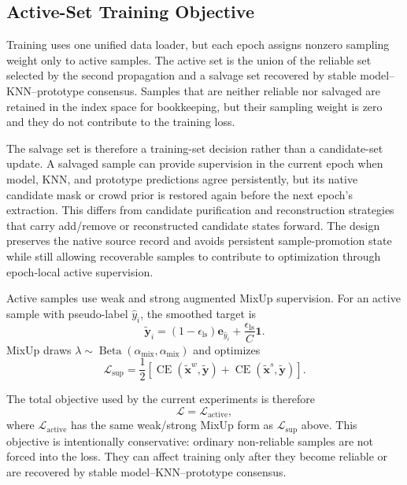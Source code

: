 \subsection{Active-Set Training Objective}
Training uses one unified data loader, but each epoch assigns nonzero sampling
weight only to active samples. The active set is the union of the reliable set
selected by the second propagation and a salvage set recovered by stable
model--KNN--prototype consensus. Samples that are neither reliable nor salvaged
are retained in the index space for bookkeeping, but their sampling weight is
zero and they do not contribute to the training loss.

The salvage set is therefore a training-set decision rather than a
candidate-set update. A salvaged sample can provide supervision in the current
epoch when model, KNN, and prototype predictions agree persistently, but its
native candidate mask or crowd prior is restored again before the next epoch's
extraction. This differs from candidate purification and reconstruction
strategies that carry add/remove or reconstructed candidate states forward. The
design preserves the native source record and avoids persistent sample-promotion
state while still allowing recoverable samples to contribute to optimization
through epoch-local active supervision.

Active samples use weak and strong augmented MixUp supervision. For an active
sample with pseudo-label $\hat{y}_i$, the smoothed target is
\begin{equation}
    \tilde{\mathbf{y}}_i =
    (1-\epsilon_{\mathrm{ls}})\mathbf{e}_{\hat{y}_i}
    + \frac{\epsilon_{\mathrm{ls}}}{C}\mathbf{1}.
\end{equation}
MixUp draws $\lambda\sim\operatorname{Beta}(\alpha_{\mathrm{mix}},\alpha_{\mathrm{mix}})$ and optimizes
\begin{equation}
    \mathcal{L}_{\mathrm{sup}}
    =
    \frac{1}{2}
    \left[
    \operatorname{CE}(\tilde{\mathbf{x}}^w,\tilde{\mathbf{y}})
    +
    \operatorname{CE}(\tilde{\mathbf{x}}^s,\tilde{\mathbf{y}})
    \right].
\end{equation}

The total objective used by the current experiments is therefore
\begin{equation}
    \mathcal{L}
    =
    \mathcal{L}_{\mathrm{active}},
    \label{eq:total_loss}
\end{equation}
where $\mathcal{L}_{\mathrm{active}}$ has the same weak/strong MixUp form as
$\mathcal{L}_{\mathrm{sup}}$ above. This objective is intentionally conservative:
ordinary non-reliable samples are not forced into the loss. They can affect
training only after they become reliable or are recovered by stable
model--KNN--prototype consensus.

